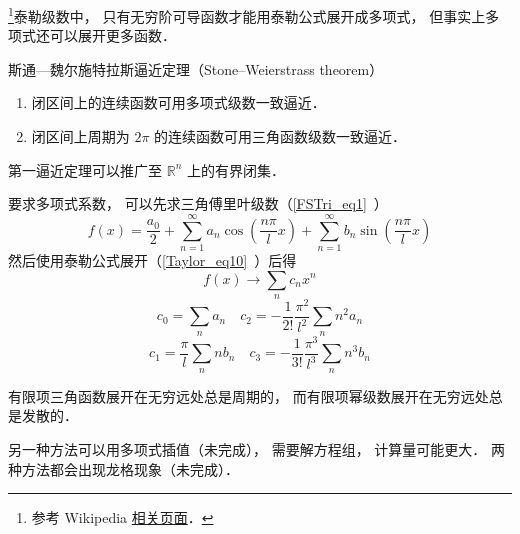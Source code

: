 

\footnote{参考 Wikipedia \href{https://en.wikipedia.org/wiki/Stone–Weierstrass theorem}{相关页面}．}泰勒级数中， 只有无穷阶可导函数才能用泰勒公式展开成多项式， 但事实上多项式还可以展开更多函数．

\begin{theorem}{斯通—魏尔施特拉斯逼近定理（Stone–Weierstrass theorem）}
\begin{enumerate}
斯通—魏尔施特拉斯逼近定理有两个
\item 闭区间上的连续函数可用多项式级数一致逼近．
\item 闭区间上周期为 $2\pi$ 的连续函数可用三角函数级数一致逼近．
\end{enumerate}
第一逼近定理可以推广至 $\mathbb {R}^{n}$ 上的有界闭集．
\end{theorem}

要求多项式系数， 可以先求三角傅里叶级数（\autoref{FSTri_eq1}~）
\begin{equation}
f(x) = \frac{a_0}{2} + \sum_{n = 1}^\infty a_n \cos (\frac{n\pi}{l}x) + \sum_{n = 1}^\infty b_n \sin (\frac{n\pi}{l}x)
\end{equation}
然后使用泰勒公式展开（\autoref{Taylor_eq10}~）后得
\begin{equation}
f(x) \to \sum_n c_n x^n
\end{equation}
\begin{equation}
c_0 = \sum_n a_n
\quad
c_2 = -\frac{1}{2!}\frac{\pi^2}{l^2} \sum_n n^2 a_n
\end{equation}
\begin{equation}
c_1 = \frac{\pi}{l} \sum_n n b_n
\quad
c_3 = -\frac{1}{3!}\frac{\pi^3}{l^3} \sum_n n^3 b_n
\end{equation}

有限项三角函数展开在无穷远处总是周期的， 而有限项幂级数展开在无穷远处总是发散的．

另一种方法可以用多项式插值（未完成）， 需要解方程组， 计算量可能更大． 两种方法都会出现龙格现象（未完成）．
